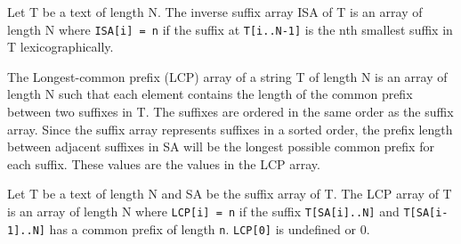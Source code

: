 \begin{definition} 
    Let T be a text of length N.
    The inverse suffix array ISA of T is an array of length N where \texttt{ISA[i] = n} if the
    suffix at \texttt{T[i..N-1]} is the nth smallest suffix in T lexicographically.
\end{definition}

The Longest-common prefix (LCP) array of a string T of length N is an array of length N
such that each element contains the length of the common prefix between two suffixes in T.
The suffixes are ordered in the same order as the suffix array. Since the suffix array
represents suffixes in a sorted order, the prefix length between adjacent suffixes in SA
will be the longest possible common prefix for each suffix. These values are the values in
the LCP array.

\begin{definition}
    Let T be a text of length N and SA be the suffix array of T.
    The LCP array of T is an array of length N where \texttt{LCP[i] = n} if the suffix
    \texttt{T[SA[i]..N]} and \texttt{T[SA[i-1]..N]} has a common prefix of length
    \texttt{n}. \texttt{LCP[0]} is undefined or {0}.
\end{definition}

